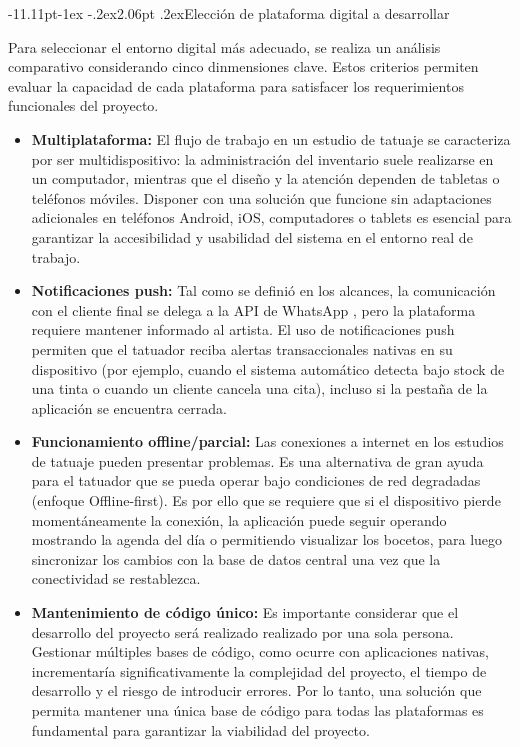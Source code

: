 \documentclass[12pt,letterpaper,oneside]{report}
\makeatletter
\renewcommand\subsection{\@startsection{subsection}{2}{\z@}%
  {-11.11pt\@plus -1ex \@minus -.2ex}{2.06pt \@plus .2ex}{\normalfont\normalsize\bfseries}}
\makeatother
\begin{document}
\subsection{Elección de plataforma digital a desarrollar}

Para seleccionar el entorno digital más adecuado, se realiza un análisis comparativo considerando cinco dinmensiones clave. Estos criterios permiten evaluar la capacidad de cada plataforma para satisfacer los requerimientos funcionales del proyecto.

\begin{itemize}
  \item \textbf{Multiplataforma:} El flujo de trabajo en un estudio de tatuaje se caracteriza por ser multidispositivo: la administración del inventario suele realizarse en un computador, mientras que el diseño y la atención dependen de tabletas o teléfonos móviles. Disponer con una solución que funcione sin adaptaciones adicionales en teléfonos Android, iOS, computadores o tablets es esencial para garantizar la accesibilidad y usabilidad del sistema en el entorno real de trabajo.

  \item \textbf{Notificaciones push:} Tal como se definió en los alcances, la comunicación con el cliente final se delega a la API de WhatsApp \cite{whatsappapi}, pero la plataforma requiere mantener informado al artista. El uso de notificaciones push permiten que el tatuador reciba alertas transaccionales nativas en su dispositivo (por ejemplo, cuando el sistema automático detecta bajo stock de una tinta o cuando un cliente cancela una cita), incluso si la pestaña de la aplicación se encuentra cerrada.

  \item \textbf{Funcionamiento offline/parcial:} Las conexiones a internet en los estudios de tatuaje pueden presentar problemas. Es una alternativa de gran ayuda para el tatuador que se pueda operar bajo condiciones de red degradadas (enfoque Offline-first). Es por ello que se requiere que si el dispositivo pierde momentáneamente la conexión, la aplicación puede seguir operando mostrando la agenda del día o permitiendo visualizar los bocetos, para luego sincronizar los cambios con la base de datos central una vez que la conectividad se restablezca.

  \item \textbf{Mantenimiento de código único:} Es importante considerar que el desarrollo del proyecto será realizado realizado por una sola persona. Gestionar múltiples bases de código, como ocurre con aplicaciones nativas, incrementaría significativamente la complejidad del proyecto, el tiempo de desarrollo y el riesgo de introducir errores. Por lo tanto, una solución que permita mantener una única base de código para todas las plataformas es fundamental para garantizar la viabilidad del proyecto.


\end{itemize}
\end{document}
